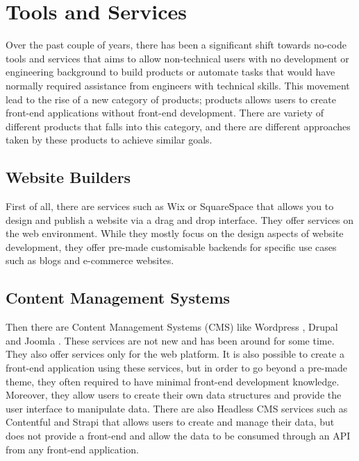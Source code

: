 \section{Tools and Services} \label{relatedTools}

Over the past couple of years, there has been a significant shift towards no-code tools and services that aims to allow non-technical users with no development or engineering background to build products or automate tasks that would have normally required assistance from engineers with technical skills. This movement lead to the rise of a new category of products; products allows users to create front-end applications without front-end development. There are variety of different products that falls into this category, and there are different approaches taken by these products to achieve similar goals.

\subsection{Website Builders}

First of all, there are services such as Wix \cite{Wix} or SquareSpace \cite{SquareSpace} that allows you to design and publish a website via a drag and drop interface. They offer services on the web environment. While they mostly focus on the design aspects of website development, they offer pre-made customisable backends for specific use cases such as blogs and e-commerce websites.

\subsection{Content Management Systems}

Then there are Content Management Systems (CMS) like Wordpress \cite{Wordpress}, Drupal \cite{Drupal} and Joomla \cite{Joomla}. These services are not new and has been around for some time. They also offer services only for the web platform. It is also possible to create a front-end application using these services, but in order to go beyond a pre-made theme, they often required to have minimal front-end development knowledge. Moreover, they allow users to create their own data structures and provide the user interface to manipulate data. There are also Headless CMS services such as Contentful \cite{Contentful} and Strapi \cite{Strapi} that allows users to create and manage their data, but does not provide a front-end and allow the data to be consumed through an API from any front-end application.

